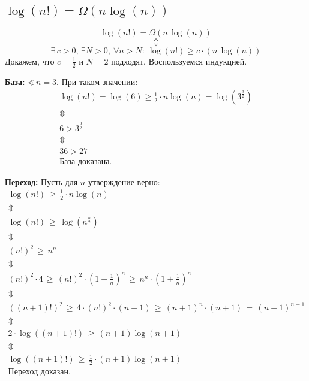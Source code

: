 	\subsection{$\log(n!) = \Omega(n\log(n))$}
		$$\log(n!) = \Omega(n\,\log(n))$$
		$$\Updownarrow$$
		$$\exists \, c>0,\, \exists N>0,\: \forall n > N:\: \log(n!) \geq c\cdot(n\,\log(n))$$	
		Докажем, что $c=\frac{1}{2}$ и $N=2$ подходят. Воспользуемся индукцией.
		
		\textbf{База:}
		$\sphericalangle \: n=3$. При таком значении:
		\begin{gather*}
		\log(n!) = \log(6) \geq \frac{1}{2}\cdot n\log(n) = \log(3^{\frac{3}{2}})
		\\
		\Updownarrow
		\\
		6 > 3^{\frac{3}{2}}
		\\
		\Updownarrow
		\\
		36 > 27
		\\
		\text{База доказана.}
		\end{gather*}
		
		\textbf{Переход:}
		Пусть для $n$ утверждение верно:
		\begin{gather*}
		\log(n!) \,\geq\, \frac{1}{2}\cdot n\log(n)
		\\
		\Updownarrow
		\\
		\log(n!) \,\geq\, \log(n^{\frac{n}{2}})
		\\
		\Updownarrow
		\\
		(n!)^2 \,\geq\, n^n
		\\
		\Updownarrow
		\\
		(n!)^2 \cdot 4 \,\geq\, (n!)^2 \cdot \left(1+\frac{1}{n}\right)^n \,\geq\, n^n \cdot \left(1+\frac{1}{n}\right)^n
		\\
		\Updownarrow
		\\
		((n+1)!)^2 \,\geq\, 4\cdot(n!)^2 \cdot (n+1) \,\geq\, (n+1)^n \cdot (n+1) \,=\, (n+1)^{n+1}
		\\
		\Updownarrow
		\\
		2\cdot\log((n+1)!) \,\geq\, (n+1)\log(n+1)
		\\
		\Updownarrow
		\\
		\log((n+1)!) \,\geq\, \frac{1}{2} \cdot (n+1)\log(n+1)
		\\
		\text{Переход доказан.}
		\end{gather*}
		
		
		
		
		
		
